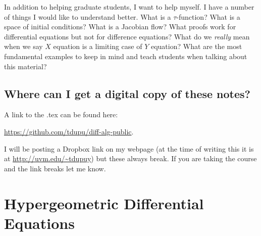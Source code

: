 \documentclass[]{book}
\numberwithin{equation}{section}
\theoremstyle{definition}
\theoremstyle{remark}
\begin{document}
In addition to helping graduate students, I want to help  myself.
I have a number of things I would like to understand better. What is a $\tau$-function? What is a space of initial conditions? 
What is a Jacobian flow? What proofs work for differential equations but not for difference equations? 
What do we \emph{really} mean when we say $X$ equation is a limiting case of $Y$ equation?
What are the most fundamental examples to keep in mind and teach students when talking about this material?




\section{Where can I get a digital copy of these notes?}
A link to the .tex can be found here:
\begin{center}
	\url{https://github.com/tdupu/diff-alg-public}.
\end{center}
I will be posting a Dropbox link on my webpage (at the time of writing this it is at \url{http://uvm.edu/~tdupuy}) but these always break. 
If you are taking the course and the link breaks let me know.

\mainmatter

\chapter{Hypergeometric Differential Equations}





\backmatter



\end{document}
